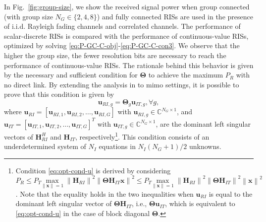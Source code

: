 \documentclass[twocolumn,10pt]{IEEEtran}
\begin{document}
In Fig.~\ref{fig:group-size}, we show the received signal power when group connected (with group size $N_{G}\in\{2,4,8\}$) and fully connected RISs are used in the presence of i.i.d. Rayleigh fading channels and correlated channels.
The performance of scalar-discrete RISs is compared with the performance of continuous-value RISs, optimized by solving \eqref{eq:P-GC-C-obj}-\eqref{eq:P-GC-C-con3}.
We observe that the higher the group size, the fewer resolution bits are necessary to reach the performance of continuous-value RISs.
The rationale behind this behavior is given by the necessary and sufficient condition for $\boldsymbol{\Theta}$ to achieve the maximum $P_R$ with no direct link.
By extending the analysis in \cite{she20} to \gls{mimo} settings, it is possible to prove that this condition is given by
\begin{equation}
\mathbf{u}_{RI,g}=\boldsymbol{\Theta}_{g}\mathbf{u}_{IT,g},\forall g,
\label{eq:opt-cond-u}
\end{equation}
where $\mathbf{u}_{RI}=\left[\mathbf{u}_{RI,1},\mathbf{u}_{RI,2},\ldots,\mathbf{u}_{RI,G}\right]$ with $\mathbf{u}_{RI,g}\in\mathbb{C}^{N_{G}\times1}$, and $\mathbf{u}_{IT}=\left[\mathbf{u}_{IT,1},\mathbf{u}_{IT,2},\ldots,\mathbf{u}_{IT,G}\right]^{T}$ with $\mathbf{u}_{IT,g}\in\mathbb{C}^{N_{G}\times1}$, are the dominant left singular vectors of $\mathbf{H}_{RI}^{H}$ and $\mathbf{H}_{IT}$, respectively\footnote{
Condition \eqref{eq:opt-cond-u} is derived by considering $P_{R}\leq P_{T}\underset{\left\|\mathbf{x}\right\|=1}{\mathsf{\mathrm{max}}}\;\left\|\mathbf{H}_{RI}\right\|^{2}\left\|\boldsymbol{\Theta}\mathbf{H}_{IT}\mathbf{x}\right\|^{2}\leq P_{T}\underset{\left\|\mathbf{x}\right\|=1}{\mathsf{\mathrm{max}}}\;\left\|\mathbf{H}_{RI}\right\|^{2}\left\|\boldsymbol{\Theta}\mathbf{H}_{IT}\right\|^{2}\left\|\mathbf{x}\right\|^{2}$.
Note that the equality holds in the two inequalities when $\mathbf{u}_{RI}$ is equal to the dominant left singular vector of $\boldsymbol{\Theta}\mathbf{H}_{IT}$, i.e., $\boldsymbol{\Theta}\mathbf{u}_{IT}$, which is equivalent to \eqref{eq:opt-cond-u} in the case of block diagonal $\boldsymbol{\Theta}$.}.
This condition consists of an underdetermined system of $N_{I}$ equations in $N_{I}\left(N_{G}+1\right)/2$ unknowns.
\end{document}
